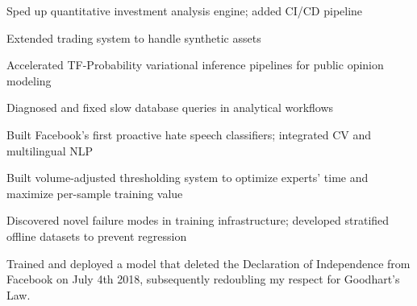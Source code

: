 \documentclass[]{resume}
\begin{document}
\begin{tightemize}
    \item Sped up quantitative investment analysis engine; added CI/CD pipeline
    \item Extended trading system to handle synthetic assets
\end{tightemize}
\sectionsep

\begin{tightemize}
    \item Accelerated TF-Probability variational inference pipelines for public opinion modeling
    \item Diagnosed and fixed slow database queries in analytical workflows
\end{tightemize}
\sectionsep

\begin{tightemize}
    \item Built Facebook's first proactive hate speech classifiers; integrated CV and multilingual NLP
    \item Built volume-adjusted thresholding system to optimize experts' time and maximize per-sample training value
    \item Discovered novel failure modes in training infrastructure; developed stratified offline datasets to prevent regression
    \item Trained and deployed a model that deleted the Declaration of Independence from Facebook on July 4th 2018, subsequently redoubling my respect for Goodhart's Law.
\end{tightemize}
\sectionsep

\sectionsep

\sectionsep

\sectionsep

\descript{}
\end{document}
